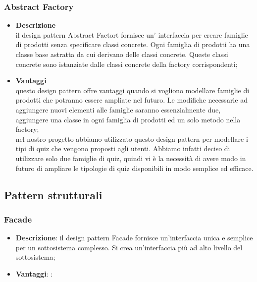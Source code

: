 	\subsubsection{Abstract Factory}
		\begin{itemize}
			\item \textbf{Descrizione}\\ il design pattern Abstract Factort fornisce un' interfaccia per creare famiglie di prodotti senza specificare classi concrete. Ogni famiglia di prodotti ha una classe base astratta da cui derivano delle classi concrete. Queste classi concrete sono istanziate dalle classi concrete della factory corrispondenti;
			
			\item \textbf{Vantaggi}\\ questo design pattern offre vantaggi quando si vogliono modellare famiglie di prodotti che potranno essere ampliate nel futuro. Le modifiche necessarie ad aggiungere nuovi elementi alle famiglie saranno essenzialmente due, aggiungere una classe in ogni famiglia di prodotti ed un solo metodo nella factory;
			\utilizzo \\ nel nostro progetto abbiamo utilizzato questo design pattern per modellare i tipi di quiz che vengono proposti agli utenti. Abbiamo infatti deciso di utilizzare solo due famiglie di quiz, quindi vi è la necessità di avere modo in futuro di ampliare le tipologie di quiz disponibili in modo semplice ed efficace.
			
		\end{itemize}
		
\subsection{Pattern strutturali}
	\subsubsection{Facade}
		\begin{itemize}
			\item \textbf{Descrizione}: il design pattern Facade fornisce un'interfaccia unica e semplice per un sottosistema complesso. Si crea un'interfaccia più ad alto livello del sottosistema;
			\item \textbf{Vantaggi}: 
			\utilizzo: %
		\end{itemize}
